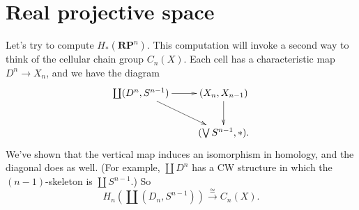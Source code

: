 \section{Real projective space}


Let's try to compute $H_\ast(\mathbf{RP}^n)$. This computation will invoke a 
second way to think of the cellular chain group $C_n(X)$. Each cell has a 
characteristic map $D^n\to X_n$, and we have the diagram
\[
\xymatrix{
\coprod(D^n,S^{n-1}) \ar[r] \ar[dr] & (X_n,X_{n-1}) \ar[d] \\
& (\bigvee S^{n-1},\ast).
}\]
We've shown that the vertical map induces an isomorphism in homology, and
the diagonal does as well. (For example, $\coprod D^n$ has a CW structure 
in which the $(n-1)$-skeleton is $\coprod S^{n-1}$.) So 
\[
H_n(\coprod(D_n,S^{n-1}))\xrightarrow{\cong}C_n(X).
\]
 
